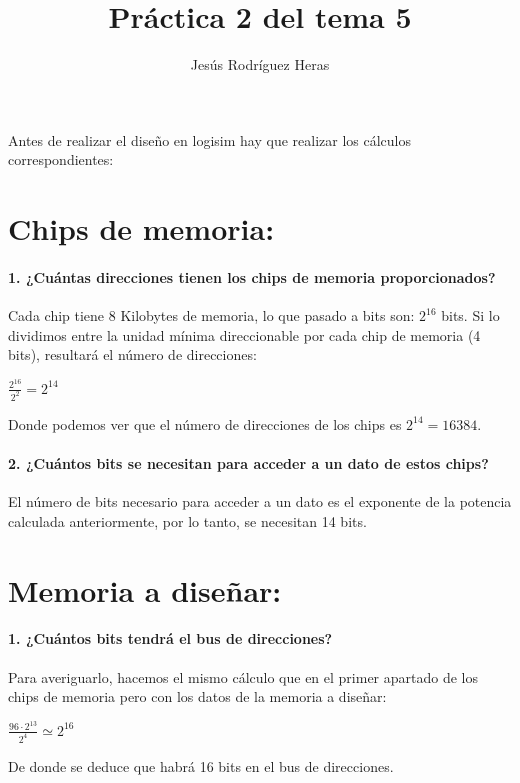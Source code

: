 \documentclass[12pt,letterpapper]{article}
\begin{document}
\author{Jesús Rodríguez Heras}
\title{Práctica 2 del tema 5}
\maketitle


Antes de realizar el diseño en logisim hay que realizar los cálculos correspondientes:

\section{Chips de memoria:}
\paragraph{1. ¿Cuántas direcciones tienen los chips de memoria proporcionados?\\} 
Cada chip tiene 8 Kilobytes de memoria, lo que pasado a bits son: $2^{16}$ bits. Si lo dividimos entre la unidad mínima direccionable por cada chip de memoria (4 bits), resultará el número de direcciones:
\begin{center}
	$\frac{2^{16}}{2^2}=2^{14}$
\end{center} 
Donde podemos ver que el número de direcciones de los chips es $2^{14}=16384$.

\paragraph{2. ¿Cuántos bits se necesitan para acceder a un dato de estos chips?\\}
El número de bits necesario para acceder a un dato es el exponente de la potencia calculada anteriormente, por lo tanto, se necesitan 14 bits.\\

\section{Memoria a diseñar:}
\paragraph{1. ¿Cuántos bits tendrá el bus de direcciones?\\}
Para averiguarlo, hacemos el mismo cálculo que en el primer apartado de los chips de memoria pero con los datos de la memoria a diseñar:
\begin{center}
	$\frac{96 \cdot 2^{13}}{2^4}\simeq2^{16}$
\end{center}
De donde se deduce que habrá 16 bits en el bus de direcciones.
\newpage
\end{document}
